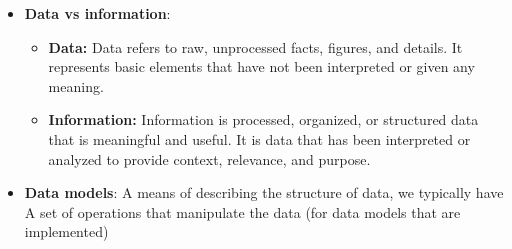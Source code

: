 \documentclass{report}
\begin{document}
\begin{itemize}
    \item \textbf{Data vs information}: 
        \begin{itemize}
            \item \textbf{Data:} Data refers to raw, unprocessed facts, figures, and details. It represents basic elements that have not been interpreted or given any meaning.
            \item \textbf{Information:} Information is processed, organized, or structured data that is meaningful and useful. It is data that has been interpreted or analyzed to provide context, relevance, and purpose.
        \end{itemize}
    \item \textbf{Data models}: A means of describing the structure of data, we typically have A set of operations that manipulate the data (for data models that are implemented)
    \end{itemize}
\end{document}
